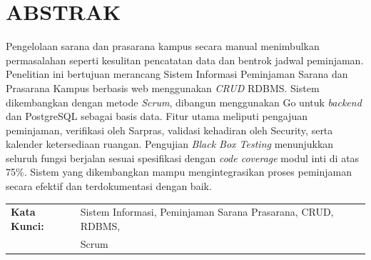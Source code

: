 \chapter*{ABSTRAK}

\begin{singlespace}
\sloppy
\noindent
Pengelolaan sarana dan prasarana kampus secara manual menimbulkan permasalahan seperti kesulitan pencatatan data dan bentrok jadwal peminjaman. Penelitian ini bertujuan merancang Sistem Informasi Peminjaman Sarana dan Prasarana Kampus berbasis web menggunakan \textit{CRUD} RDBMS. Sistem dikembangkan dengan metode \textit{Scrum}, dibangun menggunakan Go untuk \textit{backend} dan PostgreSQL sebagai basis data. Fitur utama meliputi pengajuan peminjaman, verifikasi oleh Sarpras, validasi kehadiran oleh Security, serta kalender ketersediaan ruangan. Pengujian \textit{Black Box Testing} menunjukkan seluruh fungsi berjalan sesuai spesifikasi dengan \textit{code coverage} modul inti di atas 75\%. Sistem yang dikembangkan mampu mengintegrasikan proses peminjaman secara efektif dan terdokumentasi dengan baik.

\vspace{0.5cm}
\noindent
\begin{tabular}{@{}ll}
\textbf{Kata Kunci:} & Sistem Informasi, Peminjaman Sarana Prasarana, CRUD, RDBMS, \\
                     & Scrum
\end{tabular}
\end{singlespace}
